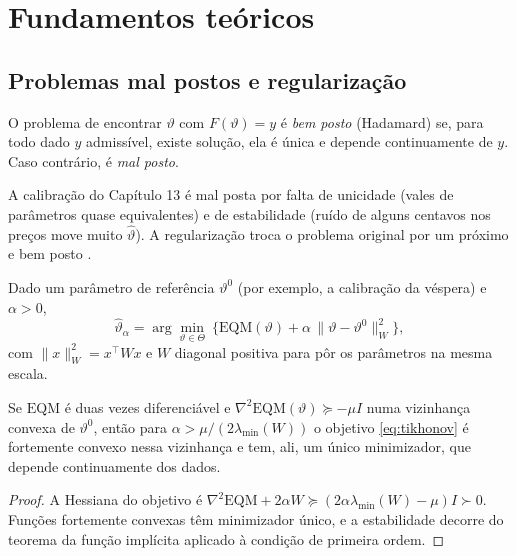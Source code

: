 \section{Fundamentos teóricos}

\subsection{Problemas mal postos e regularização}

\begin{definicao}
O problema de encontrar $\vartheta$ com $F(\vartheta)=y$ é \emph{bem posto} (Hadamard) se, para todo dado $y$ admissível, existe solução, ela é única e depende continuamente de $y$. Caso contrário, é \emph{mal posto}.
\end{definicao}

A calibração do Capítulo 13 é mal posta por falta de unicidade (vales de parâmetros quase equivalentes) e de estabilidade (ruído de alguns centavos nos preços move muito $\hat\vartheta$). A regularização troca o problema original por um próximo e bem posto \citep{englhankeneubauer1996}.

\begin{definicao}
Dado um parâmetro de referência $\vartheta^0$ (por exemplo, a calibração da véspera) e $\alpha>0$,
\begin{equation}\label{eq:tikhonov}
\hat\vartheta_\alpha=\arg\min_{\vartheta\in\Theta}\ \Big\{\mathrm{EQM}(\vartheta)+\alpha\,\|\vartheta-\vartheta^0\|^2_W\Big\},
\end{equation}
com $\|x\|^2_W=x^\top Wx$ e $W$ diagonal positiva para pôr os parâmetros na mesma escala.
\end{definicao}

\begin{proposicao}
Se $\mathrm{EQM}$ é duas vezes diferenciável e $\nabla^2\mathrm{EQM}(\vartheta)\succeq-\mu I$ numa vizinhança convexa de $\vartheta^0$, então para $\alpha>\mu/(2\lambda_{\min}(W))$ o objetivo \eqref{eq:tikhonov} é fortemente convexo nessa vizinhança e tem, ali, um único minimizador, que depende continuamente dos dados.
\end{proposicao}

\begin{proof}
A Hessiana do objetivo é $\nabla^2\mathrm{EQM}+2\alpha W\succeq(2\alpha\lambda_{\min}(W)-\mu)I\succ0$. Funções fortemente convexas têm minimizador único, e a estabilidade decorre do teorema da função implícita aplicado à condição de primeira ordem.
\end{proof}


